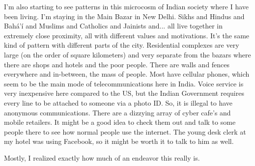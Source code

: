 \documentclass[12pt]{article}
\begin{document}
I'm also starting to see patterns in this microcosm of Indian society where I have been living. I'm staying in the Main Bazar in New Delhi. Sikhs and Hindus and Bahá'í and Muslims and Catholics and Jainists and... all live together in extremely close proximity, all with different values and motivations. It's the same kind of pattern with different parts of the city. Residential complexes are very large (on the order of square kilometers) and very separate from the bazars where there are shops and hotels and the poor people. There are walls and fences everywhere and in-between, the mass of people.  Most have cellular phones, which seem to be the main mode of telecommunications here in India. Voice service is very inexpensive here compared to the US, but the Indian Government requires every line to be attached to someone via a photo ID. So, it is illegal to have anonymous communications.  There are a dizzying array of cyber cafe's and mobile retailers. It might be a good idea to check them out and talk to some people there to see how normal people use the internet. The young desk clerk at my hotel was using Facebook, so it might be worth it to talk to him as well.

Mostly, I realized exactly how much of an endeavor this really is.
\end{document}
